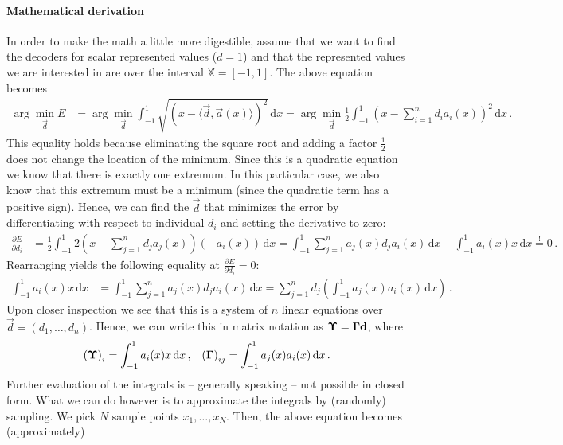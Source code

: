 \documentclass[10pt,letterpaper,oneside]{article}
\begin{document}
\paragraph{Mathematical derivation} In order to make the math a little more digestible, assume that we want to find the decoders for scalar represented values ($d = 1$) and that the represented values we are interested in are over the interval $\mathbb{X} = [-1, 1]$. The above equation becomes
\begin{align}
	\arg\min_{\vec d} E
		&= \arg\min_{\vec d} \int_{-1}^1 \sqrt{ \left(x - \langle \vec d, \vec a(x) \rangle\right)^2 } \,\mathrm{d}x
		 = \arg\min_{\vec d} \frac{1}2 \int_{-1}^1 \left(x - \sum_{i = 1}^n d_i a_i(x) \right)^2 \,\mathrm{d}x \,.
	\label{eqn:decoder_loss}
\end{align}
This equality holds because eliminating the square root and adding a factor $\frac{1}2$ does not change the location of the minimum. Since this is a quadratic equation we know that there is exactly one extremum. In this particular case, we also know that this extremum must be a minimum (since the quadratic term has a positive sign). Hence, we can find the $\vec d$ that minimizes the error by differentiating with respect to individual $d_i$ and setting the derivative to zero:
\begin{align*}
	\frac{\partial E}{\partial d_i}
		&= \frac{1}2 \int_{-1}^1 2 \left(x - \sum_{j = 1}^n d_j a_j(x) \right) \left(-a_i(x) \right) \,\mathrm{d}x
		 = \int_{-1}^1 \sum_{j = 1}^n a_j(x) d_j a_i(x) \,\mathrm{d}x - \int_{-1}^1 a_i(x) x \,\mathrm{d}x
		\overset{!}= 0 \,.
\end{align*}
Rearranging yields the following equality at $\frac{\partial E}{\partial d_i} = 0$:
\begin{align*}
	\int_{-1}^1 a_i(x) x \,\mathrm{d}x
		&= \int_{-1}^1 \sum_{j = 1}^n a_j(x) d_j a_i(x) \,\mathrm{d}x
		 = \sum_{j = 1}^n d_j \left( \int_{-1}^1 a_j(x) a_i(x) \,\mathrm{d}x \right) \,.
\end{align*}
Upon closer inspection we see that this is a system of $n$ linear equations over $\vec d = (d_1, \ldots, d_n)$. Hence, we can write this in matrix notation as ${\mathbf{\Upsilon}} = {\mathbf{\Gamma}} {\mathbf{d}}$, where
\begin{align*}
	\left( {\mathbf{\Upsilon}} \right)_i
		&= \int_{-1}^1 a_i(x) x \,\mathrm{d}x \,, &
	\left( {\mathbf{\Gamma}} \right)_{ij}
		 = \int_{-1}^1 a_j(x) a_i(x) \,\mathrm{d}x \,.
\end{align*}
Further evaluation of the integrals is -- generally speaking -- not possible in closed form. What we can do however is to approximate the integrals by (randomly) sampling. We pick $N$ sample points $x_1, \ldots, x_N$. Then, the above equation becomes (approximately)
\end{document}
